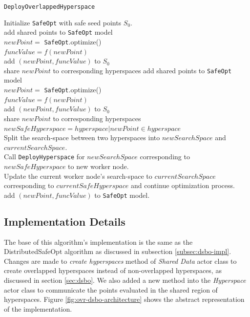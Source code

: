 \begin{algorithm}[H]
	\caption{\texttt{DeployOverlappedHyperspace}}
	\label{alg:deployovrhs}
	Initialize \texttt{SafeOpt} with safe seed points $S_0$.\\
	{
		{
			add shared points to \texttt{SafeOpt} model\\
			$newPoint=$ \texttt{SafeOpt}.optimize()\\
			$funcValue=f(newPoint)$\\
			add $(newPoint,funcValue)$ to $S_0$\\
			{
				share $newPoint$ to corresponding hyperspaces
			}
		}
		\KwRet{}
	}
	{
		add shared points to \texttt{SafeOpt} model\\
		$newPoint=$ \texttt{SafeOpt}.optimize()\\
		$funcValue=f(newPoint)$\\
		add $(newPoint,funcValue)$ to $S_0$\\
		{
			share $newPoint$ to corresponding hyperspaces
		}
		$newSafeHyperspace = hyperspace | newPoint \in hyperspace$\\
		{
			Split the search-space between two hyperspaces into $newSearchSpace$ and $currentSearchSpace$.\\
			Call \texttt{DeployHyperspace} for $newSearchSpace$ corresponding to $newSafeHyperspace$ to new worker node.\\
			Update the current worker node's search-space to $currentSearchSpace$ corresponding to $currentSafeHyperspace$ and continue optimization process.\\
		}
		{
			add $(newPoint,funcValue)$ to \texttt{SafeOpt} model.\\
		}
	}
\end{algorithm}

\subsection{Implementation Details}\label{subsec:ovr-dsbo-impl}
The base of this algorithm's implementation is the same as the DistributedSafeOpt algorithm as discussed in subsection \ref{subsec:dsbo-impl}. Changes are made to \textit{create hyperspaces} method of \textit{Shared Data} actor class to create overlapped hyperspaces instead of non-overlapped hyperspaces, as discussed in section \ref{sec:dsbo}. We also added a new method into the \textit{Hyperspace} actor class to communicate the points evaluated in the shared region of hyperspaces. Figure \ref{fig:ovr-dsbo-architecture} shows the abstract representation of the implementation.

